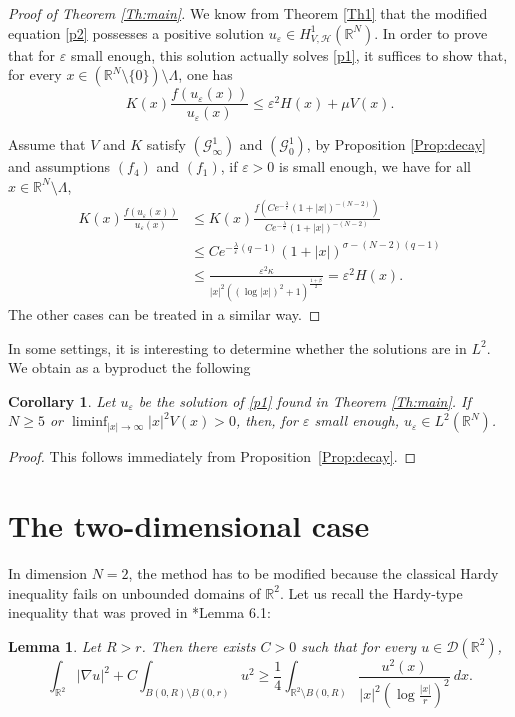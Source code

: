 \documentclass[a4paper]{amsart}
\newtheorem{lemma}[proposition]{Lemma}
\newtheorem{corollary}[proposition]{Corollary}
\begin{document}
\begin{proof}[Proof of Theorem \ref{Th:main}]
We know from Theorem \ref{Th1} that the modified equation \eqref{p2} possesses a positive solution $u_{\varepsilon} \in
H^1_{V,\mathcal{H}}({\mathbb{R}}^N)$. In order to prove that for $\varepsilon$ small enough, this solution actually solves
\eqref{p1}, it suffices to show that, for every $x \in ({\mathbb{R}}^N \setminus \{0\})\setminus \Lambda$, one
has
\[
 K(x) \frac{f(u_{\varepsilon}(x))}{u_{\varepsilon}(x)} \leq \varepsilon^2 H(x) + \mu V(x).
\]

Assume that $V$ and $K$ satisfy $(\mathcal{G}_{\infty}^1)$ and $(\mathcal{G}_{0}^1)$, by Proposition \ref{Prop:decay}
and
assumptions $(f_4)$ and $(f_1)$, if $\varepsilon > 0$ is small enough, we have for all $x \in {\mathbb{R}}^N\setminus \Lambda$,
\begin{align*}
  K(x) \frac{f(u_{\varepsilon}(x))}{u_{\varepsilon}(x)} &\leq K(x) \frac{f\left(C
e^{-\frac{\lambda}{\varepsilon}} (1+{\left| {x} \right|})^{-(N-2)}\right)}{C e^{-\frac{\lambda}{\varepsilon}} (1+{\left| {x} \right|})^{-(N-2)}} \\ 
&\leq C e^{-\frac{\lambda}{\varepsilon}(q-1)} (1+{\left| {x} \right|})^{\sigma-(N-2)(q-1)} \\ 
&\leq \frac{\varepsilon^2 \kappa}{{\left| {x} \right|}^2 \left( (\log {\left| {x} \right|})^2+1 \right)^{\frac{1+\beta}{2}}} = \varepsilon^2 H(x).
\end{align*}
The other cases can be treated in a similar way.
\end{proof}

In some settings, it is interesting to determine whether the solutions are in $L^2$. We obtain as a byproduct the following

\begin{corollary}\label{cor:L2}
 Let $u_{\varepsilon}$ be the solution of \eqref{p1} found in Theorem \ref{Th:main}. If $N \geq 5$ or $\liminf_{{\left| {x} \right|} \to \infty} {\left| {x} \right|}^2V(x) > 0$, then, for $\varepsilon$
small enough, $u_{\varepsilon} \in L^2({\mathbb{R}}^N)$.
\end{corollary}
\begin{proof}
This follows immediately from Proposition~\ref{Prop:decay}.
\end{proof}

\section{The two-dimensional case}\label{rem:N=2}
 In dimension $N = 2$, the method has to be modified because the classical Hardy inequality fails on unbounded domains
of ${\mathbb{R}}^2$. Let us recall the Hardy-type inequality that was proved in \cite{MVS}*{Lemma 6.1}:
\begin{lemma}
\label{lemmaHardyMV}
Let $R > r$. Then there exists $C > 0$ such that for every $u \in \mathcal{D}({\mathbb{R}}^2)$,
\[
 \int_{{\mathbb{R}}^2} {\left| {\nabla u} \right|}^2 + C \int_{B(0,R)\setminus B(0,r)} u^2 \geq \frac{1}{4}
\int_{{\mathbb{R}}^2\setminus B(0, R)} \frac{u^2(x)}{{\left| {x} \right|}^2 \left(\log\frac{{\left| {x} \right|}}{r}\right)^2}\: dx.
\]
\end{lemma}
\end{document}
